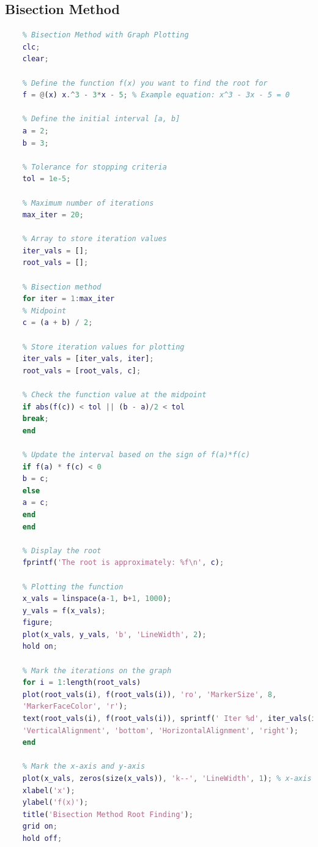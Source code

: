 \documentclass[12pt,a4paper]{article}
\begin{document}
\subsection{Bisection Method}

\begin{lstlisting}[language=Matlab]
		% MATLAB code for Bisection Method
	% Bisection Method with Graph Plotting
	clc;
	clear;
	
	% Define the function f(x) you want to find the root for
	f = @(x) x.^3 - 3*x - 5; % Example equation: x^3 - 3x - 5 = 0
	
	% Define the initial interval [a, b]
	a = 2;
	b = 3;
	
	% Tolerance for stopping criteria
	tol = 1e-5;
	
	% Maximum number of iterations
	max_iter = 20;
	
	% Array to store iteration values
	iter_vals = [];
	root_vals = [];
	
	% Bisection method
	for iter = 1:max_iter
	% Midpoint
	c = (a + b) / 2;
	
	% Store iteration values for plotting
	iter_vals = [iter_vals, iter];
	root_vals = [root_vals, c];
	
	% Check the function value at the midpoint
	if abs(f(c)) < tol || (b - a)/2 < tol
	break;
	end
	
	% Update the interval based on the sign of f(a)*f(c)
	if f(a) * f(c) < 0
	b = c;
	else
	a = c;
	end
	end
	
	% Display the root
	fprintf('The root is approximately: %f\n', c);
	
	% Plotting the function
	x_vals = linspace(a-1, b+1, 1000);
	y_vals = f(x_vals);
	figure;
	plot(x_vals, y_vals, 'b', 'LineWidth', 2);
	hold on;
	
	% Mark the iterations on the graph
	for i = 1:length(root_vals)
	plot(root_vals(i), f(root_vals(i)), 'ro', 'MarkerSize', 8, 
	'MarkerFaceColor', 'r');
	text(root_vals(i), f(root_vals(i)), sprintf(' Iter %d', iter_vals(i)),
	'VerticalAlignment', 'bottom', 'HorizontalAlignment', 'right');
	end
	
	% Mark the x-axis and y-axis
	plot(x_vals, zeros(size(x_vals)), 'k--', 'LineWidth', 1); % x-axis
	xlabel('x');
	ylabel('f(x)');
	title('Bisection Method Root Finding');
	grid on;
	hold off;
	
\end{lstlisting}
\end{document}
